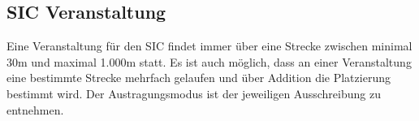 \subsection{SIC Veranstaltung}
Eine Veranstaltung für den SIC findet immer über eine Strecke zwischen minimal 30m und maximal 1.000m statt. Es ist auch möglich, dass an einer Veranstaltung eine bestimmte Strecke mehrfach gelaufen und über Addition die Platzierung bestimmt wird. Der Austragungsmodus ist der jeweiligen Ausschreibung zu entnehmen.
